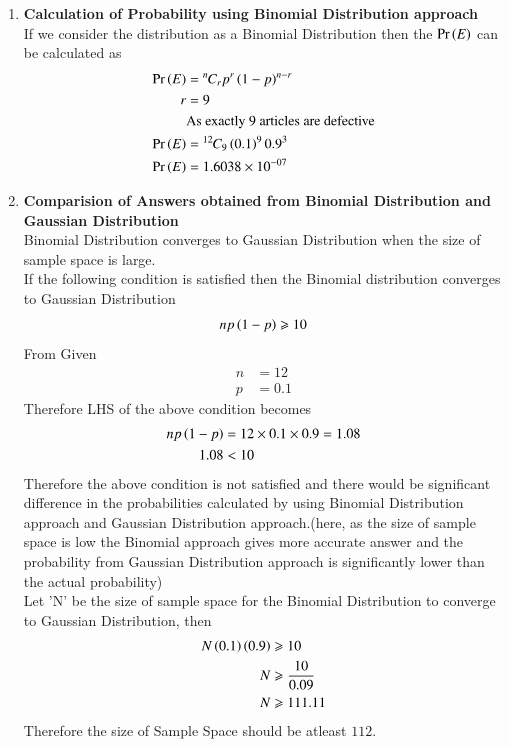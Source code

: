 \documentclass[journal,12pt,twocolumn]{IEEEtran}
\begin{document}
\begin{enumerate}[label=(\Roman*), align=left]
\begin{figure}[h]
\end{figure}
\item \textbf{Calculation of Probability using Binomial Distribution approach}
\\If we consider the distribution as a Binomial Distribution then the $\Pr\left(E\right)$ can be calculated as
 \begin{align}
    \Pr\left(E\right)&={{}^{n}\mkern-1muC_{r}}p^r\left(1-p\right)^{n-r}\\
    r&=9\\
    &\text{As exactly 9 articles are defective}\nonumber\\
    \Pr\left(E\right)&={{}^{12}\mkern-1muC_{9}}\left(0.1\right)^9{0.9}^3\\
    \Pr\left(E\right)&=1.6038 \times 10^{-07}
    \end{align}
\item \textbf{Comparision of Answers obtained from Binomial Distribution and Gaussian Distribution}
\\Binomial Distribution converges to Gaussian Distribution when the size of sample space is large.
\\If the following condition is satisfied then the Binomial distribution converges to Gaussian Distribution
 \begin{align}
    np\left(1-p\right)\geqslant 10
    \end{align}
From Given
 \begin{align}
    n&=12\nonumber\\
    p&=0.1\nonumber
    \end{align}
Therefore LHS of the above condition becomes
 \begin{align}
    np\left(1-p\right)&=12\times0.1\times0.9=1.08\nonumber\\
    1.08 &< 10\nonumber
    \end{align}
Therefore the above condition is not satisfied and there would be significant difference in the probabilities calculated by using Binomial Distribution approach and Gaussian Distribution approach.(here, as the size of sample space is low the Binomial approach gives more accurate answer and the probability from Gaussian Distribution approach is significantly lower than the actual probability)
\\Let 'N' be the size of sample space for the Binomial Distribution to converge to Gaussian Distribution, then
\begin{align}
    N\left(0.1\right)\left(0.9\right)&\geqslant 10\nonumber\\
    N&\geqslant \frac{10}{0.09}\nonumber\\
    N&\geqslant 111.11
    \end{align}
Therefore the size of Sample Space should be atleast $112$.
\end{enumerate}
\end{document}
